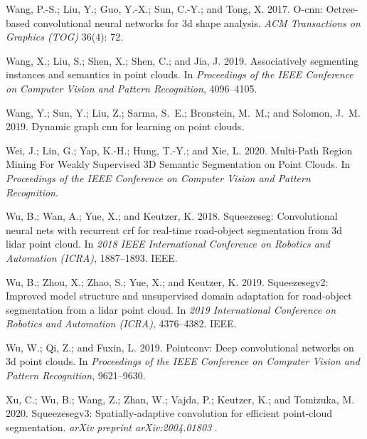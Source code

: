 \documentclass[letterpaper]{article} \usepackage{aaai21}  \usepackage{times}  \usepackage{helvet} \usepackage{courier}  \usepackage[hyphens]{url}  \usepackage{graphicx} \urlstyle{rm} \def\UrlFont{\rm}  \usepackage{natbib}  \usepackage{booktabs}
\begin{document}
\begin{thebibliography}{48}
Wang, P.-S.; Liu, Y.; Guo, Y.-X.; Sun, C.-Y.; and Tong, X. 2017.
\newblock O-cnn: Octree-based convolutional neural networks for 3d shape
  analysis.
\newblock \emph{ACM Transactions on Graphics (TOG)} 36(4): 72.

Wang, X.; Liu, S.; Shen, X.; Shen, C.; and Jia, J. 2019{}.
\newblock Associatively segmenting instances and semantics in point clouds.
\newblock In \emph{Proceedings of the IEEE Conference on Computer Vision and
  Pattern Recognition}, 4096--4105.

Wang, Y.; Sun, Y.; Liu, Z.; Sarma, S.~E.; Bronstein, M.~M.; and Solomon, J.~M.
  2019{}.
\newblock Dynamic graph cnn for learning on point clouds.

Wei, J.; Lin, G.; Yap, K.-H.; Hung, T.-Y.; and Xie, L. 2020.
\newblock Multi-Path Region Mining For Weakly Supervised 3D Semantic
  Segmentation on Point Clouds.
\newblock In \emph{Proceedings of the IEEE Conference on Computer Vision and
  Pattern Recognition}.

Wu, B.; Wan, A.; Yue, X.; and Keutzer, K. 2018.
\newblock Squeezeseg: Convolutional neural nets with recurrent crf for
  real-time road-object segmentation from 3d lidar point cloud.
\newblock In \emph{2018 IEEE International Conference on Robotics and
  Automation (ICRA)}, 1887--1893. IEEE.

Wu, B.; Zhou, X.; Zhao, S.; Yue, X.; and Keutzer, K. 2019.
\newblock Squeezesegv2: Improved model structure and unsupervised domain
  adaptation for road-object segmentation from a lidar point cloud.
\newblock In \emph{2019 International Conference on Robotics and Automation
  (ICRA)}, 4376--4382. IEEE.

Wu, W.; Qi, Z.; and Fuxin, L. 2019.
\newblock Pointconv: Deep convolutional networks on 3d point clouds.
\newblock In \emph{Proceedings of the IEEE Conference on Computer Vision and
  Pattern Recognition}, 9621--9630.

Xu, C.; Wu, B.; Wang, Z.; Zhan, W.; Vajda, P.; Keutzer, K.; and Tomizuka, M.
  2020.
\newblock Squeezesegv3: Spatially-adaptive convolution for efficient
  point-cloud segmentation.
\newblock \emph{arXiv preprint arXiv:2004.01803} .


\end{thebibliography}
\end{document}
